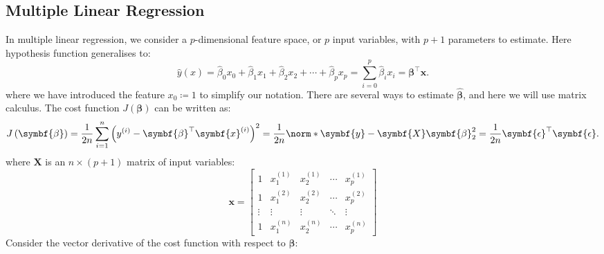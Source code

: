 \documentclass{article}
\begin{document}
\subsection{Multiple Linear Regression}
In multiple linear regression, we consider a \(p\)-dimensional feature
space, or \(p\) input variables, with \(p + 1\) parameters to estimate.
Here hypothesis function generalises to:
\begin{equation*}
    \hat{y}\left( x \right) = \hat{\beta}_0 x_0 + \hat{\beta}_1 x_1 + \hat{\beta}_2 x_2 + \cdots + \hat{\beta}_p x_p = \sum_{i = 0}^p \hat{\beta}_i x_i = \symbf{\beta}^\top \symbf{x}.
\end{equation*}
where we have introduced the feature \(x_0 \coloneq 1\) to simplify our
notation. There are several ways to estimate \(\hat{\symbf{\beta}}\),
and here we will use matrix calculus.
The cost function \(J\left( \symbf{\beta} \right)\) can be written as:
\begin{equation*}
    J\left( \symbf{\beta} \right) = \frac{1}{2n} \sum_{i = 1}^n {\left( y^{\left( i \right)} - \symbf{\beta}^\top \symbf{x}^{\left( i \right)} \right)}^2 = \frac{1}{2n} \norm*{\symbf{y} - \symbf{X} \symbf{\beta}}_2^2 = \frac{1}{2n} \symbf{\epsilon}^\top \symbf{\epsilon}.
\end{equation*}
where \(\symbf{X}\) is an \(n \times (p + 1)\) matrix of input variables:
\begin{equation*}
    \symbf{x} =
    \begin{bmatrix}
        1      & x_1^{\left( 1 \right)} & x_2^{\left( 1 \right)} & \cdots & x_p^{\left( 1 \right)} \\
        1      & x_1^{\left( 2 \right)} & x_2^{\left( 2 \right)} & \cdots & x_p^{\left( 2 \right)} \\
        \vdots & \vdots                 & \vdots                 & \ddots & \vdots                 \\
        1      & x_1^{\left( n \right)} & x_2^{\left( n \right)} & \cdots & x_p^{\left( n \right)}
    \end{bmatrix}
\end{equation*}
Consider the vector derivative of the cost function with respect to \(\symbf{\beta}\):
\end{document}
